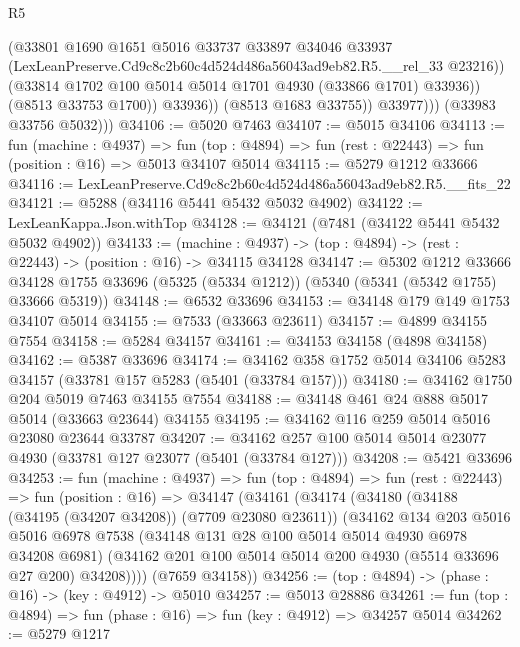\begin{lexlean}{R5}
\begin{coremodule}
                        (@33801
                          @1690
                          @1651
                          @5016
                          @33737
                          @33897
                          @34046
                          @33937
                          (LexLeanPreserve.Cd9c8c2b60c4d524d486a56043ad9eb82.R5.__rel_33 @23216))
                        (@33814 @1702 @100 @5014 @5014 @1701 @4930 (@33866 @1701) @33936))
                      (@8513 @33753 @1700))
                    @33936))
                (@8513 @1683 @33755))
              @33977)))
        (@33983 @33756 @5032)))
@34106 := @5020 @7463
@34107 := @5015 @34106
@34113 := fun (machine : @4937) =>
  fun (top : @4894) => fun (rest : @22443) => fun (position : @16) => @5013 @34107 @5014
@34115 := @5279 @1212 @33666
@34116 := LexLeanPreserve.Cd9c8c2b60c4d524d486a56043ad9eb82.R5.__fits_22
@34121 := @5288 (@34116 @5441 @5432 @5032 @4902)
@34122 := LexLeanKappa.Json.withTop
@34128 := @34121 (@7481 (@34122 @5441 @5432 @5032 @4902))
@34133 := (machine : @4937) -> (top : @4894) -> (rest : @22443) -> (position : @16) -> @34115 @34128
@34147 := @5302
    @1212
    @33666
    @34128
    @1755
    @33696
    (@5325 (@5334 @1212))
    (@5340 (@5341 (@5342 @1755) @33666 @5319))
@34148 := @6532 @33696
@34153 := @34148 @179 @149 @1753 @34107 @5014
@34155 := @7533 (@33663 @23611)
@34157 := @4899 @34155 @7554
@34158 := @5284 @34157
@34161 := @34153 @34158 (@4898 @34158)
@34162 := @5387 @33696
@34174 := @34162 @358 @1752 @5014 @34106 @5283 @34157 (@33781 @157 @5283 (@5401 (@33784 @157)))
@34180 := @34162 @1750 @204 @5019 @7463 @34155 @7554
@34188 := @34148 @461 @24 @888 @5017 @5014 (@33663 @23644) @34155
@34195 := @34162 @116 @259 @5014 @5016 @23080 @23644 @33787
@34207 := @34162 @257 @100 @5014 @5014 @23077 @4930 (@33781 @127 @23077 (@5401 (@33784 @127)))
@34208 := @5421 @33696
@34253 := fun (machine : @4937) =>
  fun (top : @4894) =>
  fun (rest : @22443) =>
  fun (position : @16) =>
  @34147
    (@34161
      (@34174
        (@34180
          (@34188 (@34195 (@34207 @34208)) (@7709 @23080 @23611))
          (@34162
            @134
            @203
            @5016
            @5016
            @6978
            @7538
            (@34148 @131 @28 @100 @5014 @5014 @4930 @6978 @34208 @6981)
            (@34162 @201 @100 @5014 @5014 @200 @4930 (@5514 @33696 @27 @200) @34208))))
      (@7659 @34158))
@34256 := (top : @4894) -> (phase : @16) -> (key : @4912) -> @5010
@34257 := @5013 @28886
@34261 := fun (top : @4894) => fun (phase : @16) => fun (key : @4912) => @34257 @5014
@34262 := @5279 @1217

\end{coremodule}
\end{lexlean}
